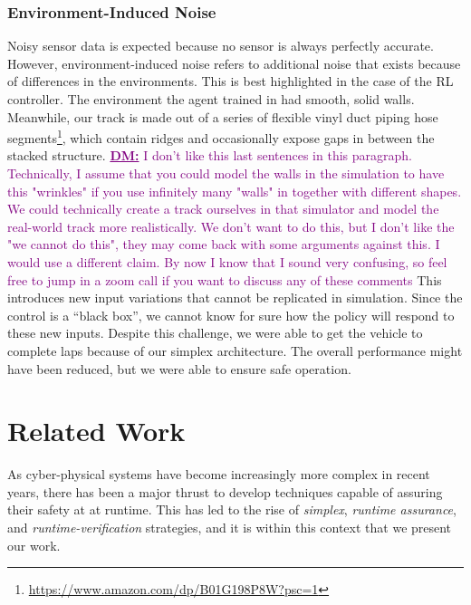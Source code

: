 \documentclass[manuscript,screen,review]{acmart}
\newcommand{\diego}[1]{\textcolor{purple}{\textbf{\underline{DM:}} #1}}
\begin{document}
\subsubsection{Environment-Induced Noise} Noisy sensor data is expected because no sensor is always perfectly accurate. However, environment-induced noise refers to additional noise that exists because of differences in the environments. This is best highlighted in the case of the RL controller. The environment the agent trained in had smooth, solid walls. Meanwhile, our track is made out of a series of flexible vinyl duct piping hose segments\footnote{\url{https://www.amazon.com/dp/B01G198P8W?psc=1}}, which contain ridges and occasionally expose gaps in between the stacked structure. \diego{I don't like this last sentences in this paragraph. Technically, I assume that you could model the walls in the simulation to have this "wrinkles" if you use infinitely many "walls" in together with different shapes. We could technically create a track ourselves in that simulator and model the real-world track more realistically. We don't want to do this, but I don't like the "we cannot do this", they may come back with some arguments against this. I would use a different claim. By now I know that I sound very confusing, so feel free to jump in a zoom call if you want to discuss any of these comments} This introduces new input variations that cannot be replicated in simulation. Since the control is a ``black box'', we cannot know for sure how the policy will respond to these new inputs. Despite this challenge, we were able to get the vehicle to complete laps because of our simplex architecture. The overall performance might have been reduced, but we were able to ensure safe operation.

\section{Related Work}

As cyber-physical systems have become increasingly more complex in recent years, there has been a major thrust to develop techniques capable of assuring their safety at at runtime. %
 This has led to the rise of \textit{simplex}, \textit{runtime assurance}, and \textit{runtime-verification} strategies, and it is within this context that we present our work.
\end{document}
